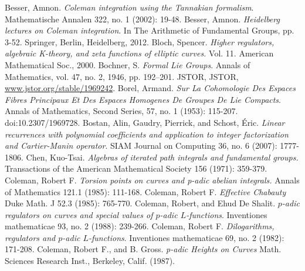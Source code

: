 \documentclass[10pt,]{book}
\numberwithin{equation}{section}
\begin{document}
\begin{thebibliography}{9}
\hypertarget{bib-besser-coleman-tannakian}{}Besser, Amnon. \textit{Coleman integration using the Tannakian formalism}. Mathematische Annalen 322, no. 1 (2002): 19-48.
\hypertarget{bib-besser-coleman-heidelberg}{}Besser, Amnon. \textit{Heidelberg lectures on Coleman integration}. In The Arithmetic of Fundamental Groups, pp. 3-52. Springer, Berlin, Heidelberg, 2012.
\hypertarget{bib-bloch}{}Bloch, Spencer.  \textit{Higher regulators, algebraic K-theory, and zeta functions of elliptic curves.} Vol. 11. American Mathematical Soc., 2000.
\hypertarget{bib-bochner-formal}{}Bochner, S. \textit{Formal Lie Groups}. Annals of Mathematics, vol. 47, no. 2, 1946, pp. 192–201. JSTOR, JSTOR, \url{www.jstor.org/stable/1969242}.
\hypertarget{bib-borel-hopf}{}Borel, Armand. \textit{Sur La Cohomologie Des Espaces Fibres Principaux Et Des Espaces Homogenes De Groupes De Lie Compacts}. Annals of Mathematics, Second Series, 57, no. 1 (1953): 115-207. doi:10.2307/1969728.
\hypertarget{bib-bostan-gaudry-schost}{}Bostan, Alin, Gaudry, Pierrick, and Schost, Éric. \textit{Linear recurrences with polynomial coefficients and application to integer factorization and Cartier-Manin operator}. SIAM Journal on Computing 36, no. 6 (2007): 1777-1806.
\hypertarget{bib-chen}{}Chen, Kuo-Tsai.  \textit{Algebras of iterated path integrals and fundamental groups.} Transactions of the American Mathematical Society 156 (1971): 359-379.
\hypertarget{bib-coleman-torsion}{}Coleman, Robert F.  \textit{Torsion points on curves and p-adic abelian integrals.} Annals of Mathematics 121.1 (1985): 111-168.
\hypertarget{bib-coleman-chabauty}{}Coleman, Robert F.  \textit{Effective Chabauty} Duke Math. J 52.3 (1985): 765-770.
\hypertarget{bib-coleman-de-shalit}{}Coleman, Robert, and Ehud De Shalit. \textit{\(p\)-adic regulators on curves and special values of \(p\)-adic \(L\)-functions}. Inventiones mathematicae 93, no. 2 (1988): 239-266.
\hypertarget{bib-coleman-dilogs}{}Coleman, Robert F. \textit{Dilogarithms, regulators and \(p\)-adic \(L\)-functions}. Inventiones mathematicae 69, no. 2 (1982): 171-208.
\hypertarget{bib-coleman-gross}{}Coleman, Robert F., and B. Gross. \textit{p-adic Heights on Curves} Math. Sciences Research Inst., Berkeley, Calif. (1987).

\end{thebibliography}
\end{document}
